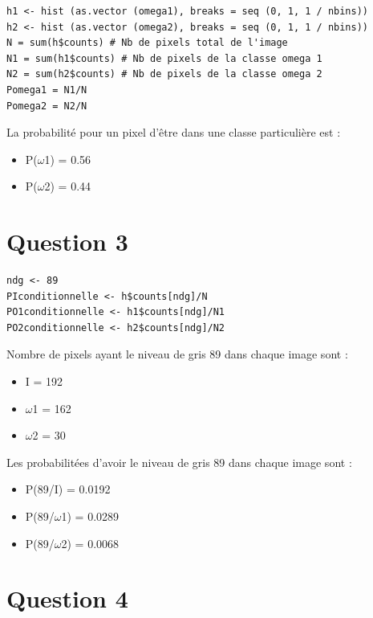 \documentclass[a4paper,12pt]{report}
\begin{document}
\begin{lstlisting}
h1 <- hist (as.vector (omega1), breaks = seq (0, 1, 1 / nbins))
h2 <- hist (as.vector (omega2), breaks = seq (0, 1, 1 / nbins))
N = sum(h$counts) # Nb de pixels total de l'image
N1 = sum(h1$counts) # Nb de pixels de la classe omega 1
N2 = sum(h2$counts) # Nb de pixels de la classe omega 2
Pomega1 = N1/N
Pomega2 = N2/N
\end{lstlisting}


La probabilité pour un pixel d'être dans une classe particulière est :

\begin{itemize}
	\item	P($\omega$1) = 0.56
	\item 	P($\omega$2) = 0.44
\end{itemize}

\newpage


\section*{Question 3}

\begin{lstlisting}
ndg <- 89
PIconditionnelle <- h$counts[ndg]/N
PO1conditionnelle <- h1$counts[ndg]/N1
PO2conditionnelle <- h2$counts[ndg]/N2
\end{lstlisting}

Nombre de pixels ayant le niveau de gris 89 dans chaque image sont :

\begin{itemize}
	\item I = 192
	\item $\omega$1 = 162
	\item $\omega$2 = 30
\end{itemize}

Les probabilitées d'avoir le niveau de gris 89 dans chaque image sont :

\begin{itemize}
	\item P(89/I) = 0.0192
	\item P(89/$\omega$1) = 0.0289
	\item P(89/$\omega$2) = 0.0068
\end{itemize}

\newpage

\section*{Question 4}
\end{document}
